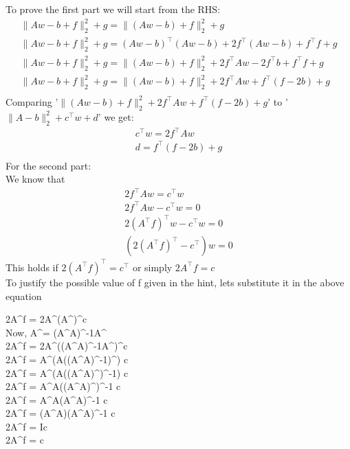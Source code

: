 \documentclass[11pt]{scrartcl}
\begin{document}
	To prove the first part we will start from the RHS:
	\begin{gather*}
	\|Aw - b + f\|_2^2 + g = \|(Aw - b) +f\|_2^2 + g\\
	\|Aw - b + f\|_2^2 + g = (Aw-b)^\intercal(Aw-b) + 2f^\intercal (Aw-b)+f^\intercal f + g\\
	\|Aw - b + f\|_2^2 + g = \|(Aw - b) +f\|_2^2 + 2f^\intercal Aw - 2f^\intercal b + f^\intercal f + g\\
	\|Aw - b + f\|_2^2 + g = \|(Aw - b) +f\|_2^2 + 2f^\intercal Aw + f^\intercal (f - 2b) + g\\
	\end{gather*}
	Comparing '$\|(Aw - b) +f\|_2^2 + 2f^\intercal Aw + f^\intercal (f - 2b) + g$' to '$\|A - b\|_2^2 + c^\intercal w + d$' we get:
	\begin{gather*}
	c^\intercal w = 2f^\intercal Aw\\
	d = f^\intercal (f - 2b) + g\\
	\end{gather*}
	For the second part:\\
	We know that
	\begin{gather*}
	2f^\intercal Aw = c^\intercal w\\
	2f^\intercal Aw - c^\intercal w = 0\\
	2(A^\intercal f)^\intercal w - c^\intercal w = 0\\
	(2(A^\intercal f)^\intercal - c^\intercal )w = 0
	\end{gather*}
	This holds if $2(A^\intercal f)^\intercal = c^\intercal$ or simply $2A^\intercal f = c$\\
	To justify the possible value of f given in the hint, lets substitute it in the above equation
	
	\begin{flalign*}
	2A^\intercal f = 2A^\intercal {}(A^\dagger)^\intercal c\\
	Now, A^\dagger = (A^\intercal A)^{-1}A^\intercal\\
	2A^\intercal f = 2A^\intercal {}((A^\intercal A)^{-1}A^\intercal)^\intercal c\\
	2A^\intercal f = A^\intercal (A((A^\intercal A)^{-1})^\intercal) c\\
	2A^\intercal f = A^\intercal (A((A^\intercal A)^\intercal)^{-1}) c\\
	2A^\intercal f = A^\intercal A((A^\intercal A)^\intercal)^{-1} c\\
	2A^\intercal f = A^\intercal A(A^\intercal A)^{-1} c\\
	2A^\intercal f = (A^\intercal A)(A^\intercal A)^{-1} c\\
	2A^\intercal f = Ic\\
	2A^\intercal f = c\\
	\end{flalign*}
	
\end{document}
